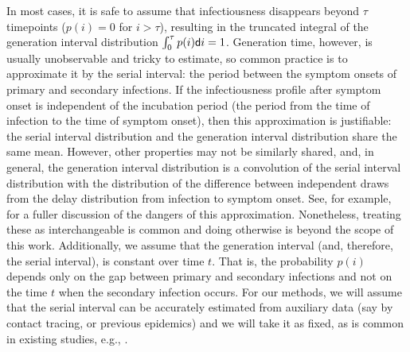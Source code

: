In most cases, it is safe to assume that infectiousness disappears beyond 
$\tau$ timepoints ($p(i) = 0$ for $i > \tau$), resulting in the truncated integral 
of the generation interval distribution $\int_0^\tau p(i)\mathsf{d} i = 1$.
Generation time, however, is usually unobservable and tricky to estimate, so
common practice is to approximate it by the serial interval: the period between
the symptom onsets of primary and secondary infections. If the infectiousness
profile after symptom onset is independent of the incubation period (the period
from the time of infection to the time of symptom onset), then this
approximation is justifiable: the serial interval distribution and the
generation interval distribution share the same mean. However, other properties
may not be similarly shared, and, in general, the generation interval
distribution is a convolution of the serial interval distribution with the
distribution of the difference between independent draws from the delay
distribution from infection to symptom onset. See, for example,
\cite{gostic2020practical} for a fuller discussion of the dangers of this
approximation. Nonetheless, treating these as interchangeable is common
\citep{cori2013new} and doing otherwise is beyond the scope of this work. 
Additionally, we assume that the generation interval (and, therefore, the 
serial interval), is constant over time $t$. That is, the probability $p(i)$ 
depends only on the gap between primary and secondary infections and not on 
the time $t$ when the secondary infection occurs. For our methods, we will 
assume that the serial interval can be accurately estimated from auxiliary 
data (say by contact tracing, or previous epidemics) and we will take it as 
fixed, as is common in existing studies, e.g., 
\cite{cori2013new,abry2020spatial,pascal2022nonsmooth}.


